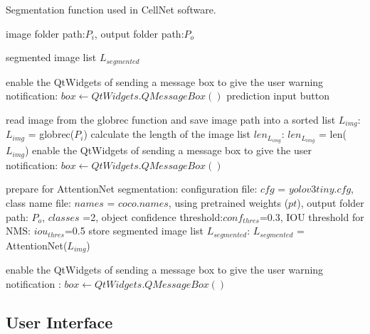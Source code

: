\begin{algorithm}[t]
  \caption{Segmentation function used in CellNet software.}
  \label{alg:Framwork}
  \begin{algorithmic}[1]
    \Require
    image folder path:$P_{i}$, output folder path:$P_{o}$
    
    \Ensure
     segmented image list $L_{segmented}$
  
      
      \State  enable the QtWidgets of sending a message box to give the user warning notification: $box  \gets QtWidgets.QMessageBox()$
      \State  \set prediction input button \false
      
    \Else
      \State  read image from the globrec function and save image path into a sorted list $L_{img}$: $L_{img}$ = globrec($P_{i}$)
      \State  calculate the length of the image list $len_{L_{img}}$: $len_{L_{img}}$ = len($L_{img}$)
      \State  enable the QtWidgets of sending a message box to give the user notification: $box  \gets QtWidgets.QMessageBox()$
    
      \State  prepare for AttentionNet segmentation: \newline configuration file: $cfg$ = $yolov3tiny.cfg$, class name file: $names$ = $coco.names$, using pretrained weights ($pt$), output folder path: $P_{o}$, $classes$ =2, object confidence threshold:$conf_{thres}$=0.3, IOU threshold for NMS: $iou_{thres}$=0.5
      \State  store segmented image list $L_{segmented}$: $L_{segmented}$ = AttentionNet($L_{img}$)
      
      \State  enable the QtWidgets of sending a message box to give the user warning notification : $box  \gets QtWidgets.QMessageBox()$
      
    \EndIf \newline
  \end{algorithmic}
\end{algorithm}

\subsection{User Interface} %
\label{sub:amet}

